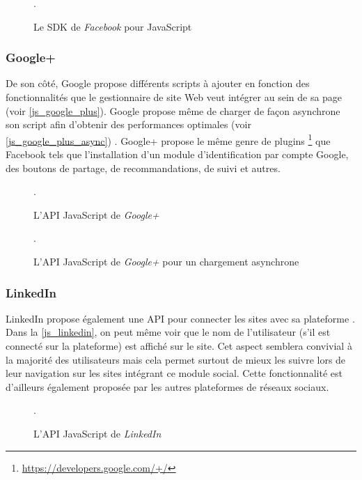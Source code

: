 \begin{figure}[h]
	\centering
	
	\caption{\label{js_facebook_sdk}Le SDK de \textit{Facebook} pour JavaScript}.
\end{figure}

\subsubsection{Google+}
De son côté, Google propose différents scripts à ajouter en fonction des fonctionnalités que le gestionnaire de site Web veut intégrer au sein de sa page (voir \autoref{js_google_plus}). Google propose même de charger de façon asynchrone son script afin d'obtenir des performances optimales (voir \autoref{js_google_plus_async}) \cite{javascript_google_plus}. Google+ propose le même genre de plugins \footnote{\url{https://developers.google.com/+/}} que Facebook tels que l'installation d'un module d'identification par compte Google, des boutons de partage, de recommandations, de suivi et autres.

\begin{figure}[h]
	\centering
	
	\caption{\label{js_google_plus}L'API JavaScript de \textit{Google+}}.
\end{figure}

\begin{figure}[h]
	\centering
	
	\caption{\label{js_google_plus_async}L'API JavaScript de \textit{Google+} pour un chargement asynchrone}.
\end{figure}

\subsubsection{LinkedIn}
LinkedIn propose également une API pour connecter les sites avec sa plateforme \cite{javascript_linkedin}. Dans la \autoref{js_linkedin}, on peut même voir que le nom de l'utilisateur (s'il est connecté sur la plateforme) est affiché sur le site. Cet aspect semblera convivial à la majorité des utilisateurs mais cela permet surtout de mieux les suivre lors de leur navigation sur les sites intégrant ce module social. Cette fonctionnalité est d'ailleurs également proposée par les autres plateformes de réseaux sociaux.

\begin{figure}[!h]
	\centering
	
	\caption{\label{js_linkedin}L'API JavaScript de \textit{LinkedIn}}.
\end{figure}

